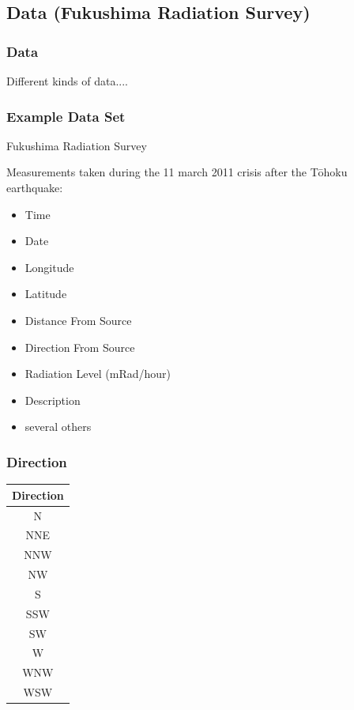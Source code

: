 \subsection{Data (Fukushima Radiation Survey)}

\begin{frame}
  \frametitle{Data}

  Different kinds of data....


\end{frame}

\begin{frame}
  \frametitle{Example Data Set}

  Fukushima Radiation Survey

  Measurements taken during the 11 march 2011 crisis after the
  T\={o}hoku earthquake:
  \begin{itemize}
  \item Time
  \item Date
  \item Longitude
  \item Latitude
  \item Distance From Source
  \item Direction From Source
  \item Radiation Level (mRad/hour)
  \item Description
  \item several others
  \end{itemize}

\end{frame}



\begin{frame}
  \frametitle{Direction}

  \begin{tabular}{c}
    Direction \\ \hline 
    N   \\
    NNE  \\
    NNW  \\
    NW  \\
    S  \\
    SSW \\
    SW  \\
    W  \\
    WNW  \\
    WSW 
  \end{tabular}

\end{frame}

